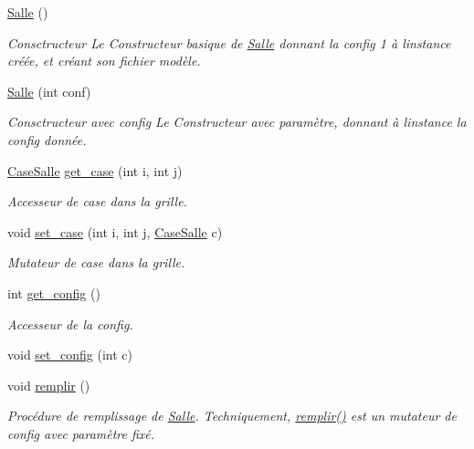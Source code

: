 \begin{DoxyCompactItemize}
\item 
\hyperlink{classSalle_a4cb05b76fb2b5430ac2bf903b8f75906}{Salle} ()
\begin{DoxyCompactList}\small\item\em Consctructeur Le Constructeur basique de \hyperlink{classSalle}{Salle} donnant la {\itshape config} 1 à l\textquotesingle{}instance créée, et créant son fichier modèle. \end{DoxyCompactList}\item 
\hyperlink{classSalle_ad5b7cf5a8567b142dd3ed77b39480afb}{Salle} (int conf)
\begin{DoxyCompactList}\small\item\em Consctructeur avec {\itshape config} Le Constructeur avec paramètre, donnant à l\textquotesingle{}instance la {\itshape config} donnée. \end{DoxyCompactList}\item 
\hyperlink{classCaseSalle}{Case\+Salle} \hyperlink{classSalle_aae17412fe140b77d027fdc3553ecd33c}{get\+\_\+case} (int i, int j)
\begin{DoxyCompactList}\small\item\em Accesseur de case dans la grille. \end{DoxyCompactList}\item 
void \hyperlink{classSalle_ac0ce53372cead99268609aba57d0fff2}{set\+\_\+case} (int i, int j, \hyperlink{classCaseSalle}{Case\+Salle} c)
\begin{DoxyCompactList}\small\item\em Mutateur de case dans la grille. \end{DoxyCompactList}\item 
int \hyperlink{classSalle_a9268968ab5741a35da4e52399a4be0b7}{get\+\_\+config} ()
\begin{DoxyCompactList}\small\item\em Accesseur de la {\itshape config}. \end{DoxyCompactList}\item 
void \hyperlink{classSalle_a3d8b62393fd9cfa15bb385e187e72189}{set\+\_\+config} (int c)
\item 
void \hyperlink{classSalle_ae6fd7211225455d887859f983e3bddce}{remplir} ()
\begin{DoxyCompactList}\small\item\em Procédure de remplissage de \hyperlink{classSalle}{Salle}. Techniquement, \hyperlink{classSalle_ae6fd7211225455d887859f983e3bddce}{remplir()} est un mutateur de {\itshape config} avec paramètre fixé. \end{DoxyCompactList}\item 

\end{DoxyCompactItemize}
